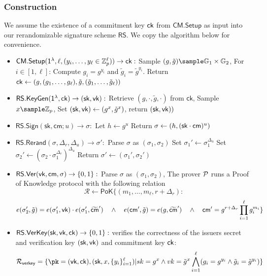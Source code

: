 \subsubsection{Construction}\label{sig-construction}
We assume the existence of a commitment key $\mathsf{ck}$ from $\mathsf{CM.Setup}$ as input into our rerandomizable signature scheme $\mathsf{RS}$. We copy the algorithm below for convenience.
\begin{itemize}
    \item $\mathsf{CM.Setup}(\mathsf{1^{\lambda}}, \ell, (y_i, \ldots, y_{\ell} \in \mathbb{Z}_p^{\ell})) \to \mathsf{ck}:$  
    Sample $(g, \tilde{g}) \sample \G_1 \times \G_2$, For $i \in [1,\ell]$: Compute $g_i = g^{y_i}$ and $\tilde{g}_i = \tilde{g}^{y_i}$. Return $\mathsf{ck} \gets (g, (g_1,\ldots,g_\ell), \tilde{g}, (\tilde{g}_1,\ldots,\tilde{g}_\ell))$
    
    \item $\mathsf{RS.KeyGen}(\mathsf{1^{\lambda}}, \mathsf{ck}) \to (\mathsf{sk}, \mathsf{vk}):$ 
        Retrieve $(g, \cdot, \tilde{g}, \cdot)$ from $\mathsf{ck}$,
        Sample $x \sample \Z_p$,
        Set $(\mathsf{sk}, \mathsf{vk}) \gets (g^x, \tilde{g}^x)$, return $(\mathsf{sk}, \mathsf{vk}))$
    
    \item $\mathsf{RS.Sign}(\mathsf{sk}, \mathsf{cm}; u) \to \sigma:$ 
        Let $h \gets g^u$
        Return $\sigma \gets (h, (\mathsf{sk} \cdot \mathsf{cm})^u)$
    
    \item $\mathsf{RS.Rerand}(\sigma, \Delta_r, \Delta_u) \to \sigma':$
        Parse $\sigma$ as $(\sigma_1, \sigma_2)$
        Set $\sigma_1' \gets \sigma_1^{\Delta_u}$
        Set $\sigma_2' \gets (\sigma_2 \cdot \sigma_1^{\Delta_r})^{\Delta_u}$
        Return $\sigma' \gets (\sigma_1', \sigma_2')$
    
    \item $\mathsf{RS.Ver}(\mathsf{vk}, \mathsf{cm}, \sigma) \to \{0,1\}:$
        Parse $\sigma$ as $(\sigma_1, \sigma_2)$, The prover $\mathcal{P}$ runs a Proof of Knowledge protocol with the following relation 
    \[
        \mathcal{R} \gets \mathsf{PoK}\{(m_1,\ldots,m_\ell, r + \Delta_r): 
    \]
    \[
         e(\sigma_2', \tilde{g}) = e(\sigma_1', \mathsf{vk})\cdot e(\sigma_1', \widetilde{\mathsf{cm}}') \quad \wedge \quad
        e(\mathsf{cm}', \tilde{g}) = e(g, \widetilde{\mathsf{cm}}') \quad \wedge \quad
        \mathsf{cm}' = g^{r + \Delta_r} \prod_{i=1}^\ell g_i^{m_i}
        \}
    \]

        \item $\mathsf{RS.VerKey}(\mathsf{sk}, \mathsf{vk}, \mathsf{ck}) \to \{0,1\}:$ verifies the correctness of the issuers secret and verification key $(\mathsf{sk}, \mathsf{vk})$ and commitment key $\mathsf{ck}$:
        \[
        \mathcal{R}_{\mathsf{verkey}} = \{\pk = (\vk, \ck),(\sk, x, \{y_i\}_{i=1}^\ell) | sk = g^x \wedge vk = \tilde{g}^x \bigwedge_{i=1}^\ell (g_i = g^{y_i} \wedge \tilde{g}_i = \tilde{g}^{y_i})\}
        \]
        
\end{itemize}



